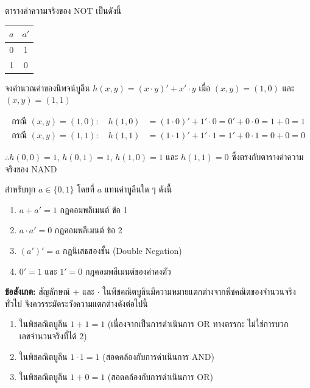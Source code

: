 ตารางค่าความจริงของ NOT เป็นดังนี้
\begin{center}
\begin{tabular}{|c|c|}
\hline
$a$ & $a'$ \\
\hline
0 & 1 \\
\hline
1 & 0 \\
\hline
\end{tabular}
\end{center}

\begin{ex}
\label{ex:eval-not-expression}
จงคำนวณค่าของนิพจน์บูลีน $h(x, y) = (x \cdot y)' + x' \cdot y$ เมื่อ $(x, y) = (1, 0)$ และ $(x, y) = (1, 1)$
\end{ex}
\begin{solution}
\begin{align*}
\text{กรณี } (x,y)=(1,0):\quad h(1, 0) &= (1 \cdot 0)' + 1' \cdot 0 = 0' + 0 \cdot 0 = 1 + 0 = 1\\
\text{กรณี } (x,y)=(1,1):\quad h(1, 1) &= (1 \cdot 1)' + 1' \cdot 1 = 1' + 0 \cdot 1 = 0 + 0 = 0
\end{align*}

$\therefore h(0,0) = 1$, $h(0,1) = 1$, $h(1,0) = 1$ และ $h(1,1) = 0$ ซึ่งตรงกับตารางค่าความจริงของ NAND \solhere
\end{solution}

\begin{prop}
สำหรับทุก $a \in \{0, 1\}$ โดยที่ $a$ แทนค่าบูลีนใด ๆ ดังนี้

\begin{enumerate}
    \item $a + a' = 1$ \hfill กฎคอมพลีเมนต์ ข้อ 1
    \item $a \cdot a' = 0$ \hfill กฎคอมพลีเมนต์ ข้อ 2
    \item $(a')' = a$ \hfill กฎนิเสธสองชั้น (Double Negation)
    \item $0' = 1$ และ $1' = 0$ \hfill กฎคอมพลีเมนต์ของค่าคงตัว
\end{enumerate}
\end{prop}

\begin{rem}
\textbf{ข้อสังเกต:} สัญลักษณ์ $+$ และ $\cdot$ ในพีชคณิตบูลีนมีความหมายแตกต่างจากพีชคณิตของจำนวนจริงทั่วไป จึงควรระมัดระวังความแตกต่างดังต่อไปนี้

\begin{enumerate}
    \item ในพีชคณิตบูลีน $1 + 1 = 1$ (เนื่องจากเป็นการดำเนินการ OR ทางตรรกะ ไม่ใช่การบวกเลขจำนวนจริงที่ได้ $2$)
    \item ในพีชคณิตบูลีน $1 \cdot 1 = 1$ (สอดคล้องกับการดำเนินการ AND)
    \item ในพีชคณิตบูลีน $1 + 0 = 1$ (สอดคล้องกับการดำเนินการ OR)
\end{enumerate}
\end{rem}

